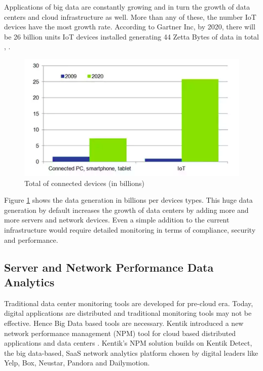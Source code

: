 \documentclass[sigconf]{acmart}
\begin{document}
Applications of big data are constantly growing and in turn the growth of data centers and cloud infrastructure as well. More than any of these, the number IoT devices have the most growth rate. According to Gartner Inc, by 2020, there will be 26 billion units IoT devices installed generating 44 Zetta Bytes of data in total \cite{communications-network-technology-advances}, \cite{digital-universe}.

\begin{figure}[htb]
  \centering
  \includegraphics[width=1.0\columnwidth]{images/Figure2.png}
  \caption{Total of connected devices (in billions) 
  \cite{communications-network-technology-advances}}
  \label{fig:Figure2} 
\end{figure}

Figure \ref{fig:Figure2} shows the data generation in billions per devices types. This huge data generation by default increases the growth of data centers by adding more and more servers and network devices. Even a simple addition to the current infrastructure would require detailed monitoring in terms of compliance, security and performance.


\subsection{Server and Network Performance Data Analytics}

Traditional data center monitoring tools are developed for pre-cloud era. Today, digital applications are distributed and traditional monitoring tools may not be effective. Hence Big Data based tools are necessary. Kentik introduced a new network performance management (NPM) tool for cloud based distributed applications and data centers \cite{kentik-introduces-new-npm-solution}. Kentik's NPM solution builds on Kentik Detect, the big data-based, SaaS network analytics platform chosen by digital leaders like Yelp, Box, Neustar, Pandora and Dailymotion.
\end{document}
